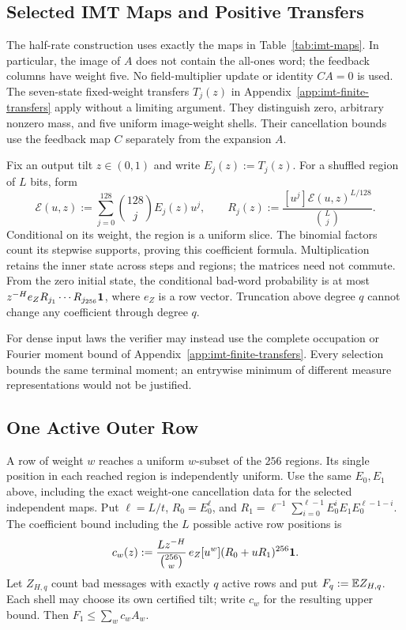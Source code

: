 \subsection{Selected IMT Maps and Positive Transfers}
\label{app:finite-inner-definition}



The half-rate construction uses exactly the maps in Table~\ref{tab:imt-maps}.
In particular, the image of $A$ does not contain the all-ones word; the
feedback columns have weight five. No field-multiplier update or identity
$CA=0$ is used. The seven-state fixed-weight transfers
$T_j(z)$ in Appendix~\ref{app:imt-finite-transfers} apply without a limiting
argument. They distinguish zero, arbitrary nonzero mass, and five uniform
image-weight shells. Their cancellation bounds use the feedback map $C$
separately from the expansion $A$.

Fix an output tilt $z\in(0,1)$ and write $E_j(z):=T_j(z)$.
For a shuffled region of $L$ bits, form
\[
 \mathcal E(u,z):=\sum_{j=0}^{128}\binom{128}{j}E_j(z)u^j,\qquad
 R_j(z):=\frac{[u^j]\mathcal E(u,z)^{L/128}}{\binom Lj}.
\]
Conditional on its weight, the region is a uniform slice. The binomial
factors count its stepwise supports, proving this coefficient formula.
Multiplication retains the inner state across steps and regions; the
matrices need not commute. From the zero initial state, the conditional
bad-word probability is at most
$z^{-H}e_ZR_{j_1}\cdots R_{j_{256}}\mathbf 1$, where $e_Z$ is a row vector.
Truncation above degree $q$ cannot change any coefficient through degree $q$.

For dense input laws the verifier may instead use the complete occupation
or Fourier moment bound of Appendix~\ref{app:imt-finite-transfers}.
Every selection bounds the same terminal moment; an entrywise minimum of
different measure representations would not be justified.

\subsection{One Active Outer Row}

A row of weight $w$ reaches a uniform $w$-subset of the $256$ regions.
Its single position in each reached region is independently uniform.
Use the same $E_0,E_1$ above, including the exact weight-one
cancellation data for the selected independent maps.
Put $\ell=L/t$, $R_0=E_0^\ell$, and
$R_1=\ell^{-1}\sum_{i=0}^{\ell-1}E_0^iE_1E_0^{\ell-1-i}$.
The coefficient bound including the $L$ possible active row positions is
\[
 c_w(z):=\frac{Lz^{-H}}{\binom{256}{w}}\,
 e_Z[u^w](R_0+uR_1)^{256}\mathbf 1.
\]
Let $Z_{H,q}$ count bad messages with exactly $q$ active rows and put
$F_q:=\mathbb E Z_{H,q}$. Each shell may choose its own certified tilt;
write $c_w$ for the resulting upper bound. Then $F_1\le\sum_w c_w A_w$.

